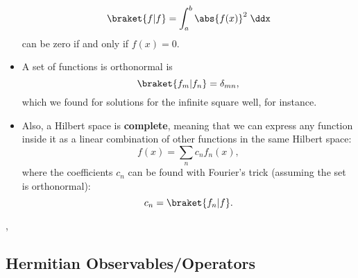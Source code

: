 \begin{itemize}
\begin{equation*}
            \braket{f|f} = \int_a^b \abs{f(x)}^2 \;\ddx
        \end{equation*}
        can be zero if and only if $f(x)=0$.
    \item A set of functions is orthonormal is
        \begin{equation*}
            \braket{f_m|f_n} = \delta_{mn},
        \end{equation*}
        which we found for solutions for the infinite square well, for instance.
    \item Also, a Hilbert space is \textbf{complete}, meaning that we can express any function inside it as a linear combination of other functions in the same Hilbert space:
        \begin{equation*}
            f(x) = \sum_n c_n f_n(x),
        \end{equation*}
        where the coefficients $c_n$ can be found with Fourier's trick (assuming the set is orthonormal):
        \begin{equation*}
            c_n = \braket{f_n | f}.
        \end{equation*}
\end{itemize}


\sep




\subsection*{Hermitian Observables/Operators}

